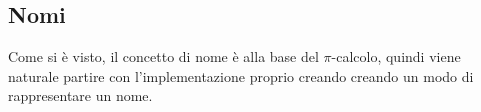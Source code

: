 \subsection{Nomi}

Come si \`e visto, il concetto di nome \`e alla base del $\pi$-calcolo,
quindi viene naturale partire con l'implementazione proprio creando creando
un modo di rappresentare un nome.



